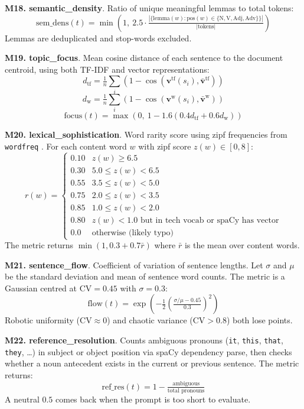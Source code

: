 \documentclass[conference]{IEEEtran}
\begin{document}
\textbf{M18. semantic\_density}. Ratio of unique meaningful lemmas to total tokens:
\[ \mathrm{sem\_dens}(t) = \min\!\left(1,\ 2.5 \cdot \tfrac{|\{\mathrm{lemma}(w) : \mathrm{pos}(w) \in \{\text{N}, \text{V}, \text{Adj}, \text{Adv}\}\}|}{|\text{tokens}|}\right) \]
Lemmas are deduplicated and stop-words excluded.

\textbf{M19. topic\_focus}. Mean cosine distance of each sentence to the document centroid, using both TF-IDF and vector representations:
\[ d_{\text{tf}} = \tfrac{1}{n}\sum_i (1 - \cos(\mathbf{v}^{\text{tf}}(s_i), \bar{\mathbf{v}}^{\text{tf}})) \]
\[ d_{\text{w}} = \tfrac{1}{n}\sum_i (1 - \cos(\mathbf{v}^{\text{w}}(s_i), \bar{\mathbf{v}}^{\text{w}})) \]
\[ \mathrm{focus}(t) = \max\!\left(0,\ 1 - 1.6 (0.4 d_{\text{tf}} + 0.6 d_{\text{w}})\right) \]

\textbf{M20. lexical\_sophistication}. Word rarity score using zipf frequencies from \texttt{wordfreq} \cite{wordfreq}. For each content word $w$ with zipf score $z(w) \in [0, 8]$:
\[ r(w) = \begin{cases}
0.10 & z(w) \geq 6.5 \\
0.30 & 5.0 \leq z(w) < 6.5 \\
0.55 & 3.5 \leq z(w) < 5.0 \\
0.75 & 2.0 \leq z(w) < 3.5 \\
0.85 & 1.0 \leq z(w) < 2.0 \\
0.80 & z(w) < 1.0 \text{ but in tech vocab or spaCy has vector} \\
0.0  & \text{otherwise (likely typo)}
\end{cases} \]
The metric returns $\min(1, 0.3 + 0.7 \bar{r})$ where $\bar{r}$ is the mean over content words.

\textbf{M21. sentence\_flow}. Coefficient of variation of sentence lengths. Let $\sigma$ and $\mu$ be the standard deviation and mean of sentence word counts. The metric is a Gaussian centred at $\mathrm{CV} = 0.45$ with $\sigma = 0.3$:
\[ \mathrm{flow}(t) = \exp\!\left(-\tfrac{1}{2}\left(\tfrac{\sigma/\mu - 0.45}{0.3}\right)^2\right) \]
Robotic uniformity ($\mathrm{CV} \approx 0$) and chaotic variance ($\mathrm{CV} > 0.8$) both lose points.

\textbf{M22. reference\_resolution}. Counts ambiguous pronouns (\texttt{it}, \texttt{this}, \texttt{that}, \texttt{they}, \ldots) in subject or object position via spaCy dependency parse, then checks whether a noun antecedent exists in the current or previous sentence. The metric returns:
\[ \mathrm{ref\_res}(t) = 1 - \tfrac{\text{ambiguous}}{\text{total pronouns}} \]
A neutral $0.5$ comes back when the prompt is too short to evaluate.
\end{document}
